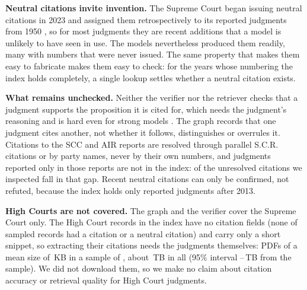 \textbf{Neutral citations invite invention.} The Supreme Court began issuing neutral citations in 2023 and assigned them retrospectively to its reported judgments from 1950 \cite{scneutral,scneutral2}, so for most judgments they are recent additions that a model is unlikely to have seen in use. The models nevertheless produced them readily, many with numbers that were never issued. The same property that makes them easy to fabricate makes them easy to check: for the \INSCCompleteCount{} years whose numbering the index holds completely, a single lookup settles whether a neutral citation exists.

\textbf{What remains unchecked.} Neither the verifier nor the retriever checks that a judgment supports the proposition it is cited for, which needs the judgment's reasoning and is hard even for strong models \cite{verma2026}. The graph records that one judgment cites another, not whether it follows, distinguishes or overrules it. Citations to the SCC and AIR reports are resolved through parallel S.C.R. citations or by party names, never by their own numbers, and judgments reported only in those reports are not in the index: \UnresNotIndex{} of the \UnresN{} unresolved citations we inspected fall in that gap. Recent neutral citations can only be confirmed, not refuted, because the index holds only reported judgments after 2013.

\textbf{High Courts are not covered.} The graph and the verifier cover the Supreme Court only. The High Court records in the index have no citation fields (none of \HCMetaN{} sampled records had a citation or a neutral citation) and carry only a short snippet, so extracting their citations needs the judgments themselves: \HCRecords{} PDFs of a mean size of \HCMeanKB\,KB in a sample of \HCSampleN{}, about \HCTotalTB\,TB in all (95\% interval \HCTotalTBLow--\HCTotalTBHigh\,TB from the sample). We did not download them, so we make no claim about citation accuracy or retrieval quality for High Court judgments.


